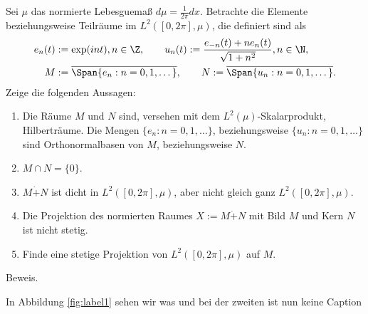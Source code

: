 \begin{exercise}
Sei $\mu$ das normierte Lebesguemaß $d\mu = \frac{1}{2\pi}dx$. Betrachte die Elemente
beziehungsweise Teilräume im $L^2([0,2\pi], \mu)$, die definiert sind als
\begin{align*}
  e_n(t) &:= \exp(int), n \in \Z, \qquad u_n(t) := \frac{e_{-n}(t) + ne_n(t)}{\sqrt{1+n^2}}, n \in \N, \\
  M &:= \overline{\Span \{e_n: n = 0,1,\dots\}}, \qquad N := \overline{\Span\{u_n: n = 0,1,\dots\}}.
\end{align*}
Zeige die folgenden Aussagen:
\begin{enumerate}[label = (\alph*)]
  \item Die Räume $M$ und $N$ sind, versehen mit dem $L^2(\mu)$-Skalarprodukt, Hilberträume.
  Die Mengen $\{e_n: n = 0,1,\dots\}$, beziehungsweise
  $\{u_n: n = 0,1,\dots\}$ sind Orthonormalbasen von $M$, beziehungsweise $N$.
  \item $M \cap N = \{0\}$.
  \item $M \dot+ N$ ist dicht in $L^2([0,2\pi],\mu)$, aber nicht gleich ganz $L^2([0,2\pi],\mu)$.
  \item Die Projektion des normierten Raumes $X := M \dot + N$ mit Bild $M$ und Kern $N$
  ist nicht stetig.
  \item Finde eine stetige Projektion von $L^2([0,2\pi],\mu)$ auf $M$.
\end{enumerate}
\end{exercise}
\begin{solution}
Beweis.


In Abbildung \ref{fig:label1} sehen wir was und bei der zweiten ist nun keine
Caption
\end{solution}
